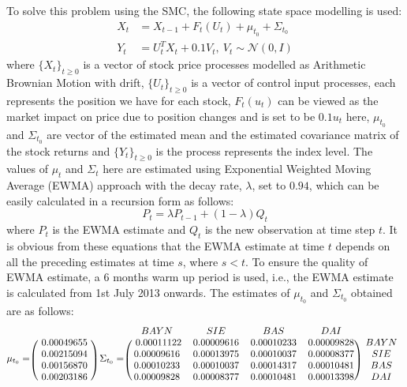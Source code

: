To solve this problem using the SMC,  the following state space modelling is used:
\begin{align}
  X_t &= X_{t-1} + F_t(U_t) + \mu_{t_0} + \Sigma_{t_0} \\
  Y_t &= U^T_tX_t + 0.1V_t,~V_t \sim \mathcal{N}(0, I)
\end{align}
where $\{X_t\}_{t \geq 0}$ is a vector of stock price processes modelled as Arithmetic Brownian Motion with drift, $\{U_t\}_{t \geq 0}$ is a vector of control input processes, each represents the position we have for each stock, $F_t(u_t)$ can be viewed as the market impact on price due to position changes and is set to be $0.1u_t$ here, $\mu_{t_0}$ and $\Sigma_{t_0}$ are vector of the estimated mean and the estimated covariance matrix of the stock returns and $\{Y_t\}_{t \geq 0}$ is the process represents the index level. The values of $\mu_t$ and $\Sigma_t$ here are estimated using Exponential Weighted Moving Average (EWMA) approach with the decay rate, $\lambda$, set to $0.94$, which can be easily calculated in a recursion form as follows:
\begin{equation}
  P_t = \lambda P_{t-1} + (1-\lambda) Q_{t}
\end{equation}
where $P_t$ is the EWMA estimate and $Q_t$ is the new observation at time step $t$. It is obvious from these equations that the EWMA estimate at time $t$ depends on all the preceding estimates at time $s$, where $s < t$. To ensure the quality of EWMA estimate, a 6 months warm up period is used, i.e., the EWMA estimate is calculated from 1st July 2013 onwards. The estimates of $\mu_{t_0}$ and $\Sigma_{t_0}$ obtained are as follows:
\begin{equation}
\mu_{t_0} =
\begin{blockarray}{c}
\\
\begin{block}{(c)}
~ 0.00049655 ~ \\
0.00215094 \\
0.00156870 \\
0.00203186 \\
\end{block}
\end{blockarray}
~\Sigma_{t_0} =
\begin{blockarray}{ccccc}
  BAYN & SIE & BAS & DAI & \\
\begin{block}{(cccc)c}
 ~ 0.00011122 & 0.00009616 & 0.00010233 & 0.00009828 ~ & BAYN \\
0.00009616 & 0.00013975 & 0.00010037 & 0.00008377 ~ & SIE \\
0.00010233 & 0.00010037 & 0.00014317 & 0.00010481 & BAS \\
0.00009828 & 0.00008377 & 0.00010481 & 0.00013398 & DAI \\
\end{block}
\end{blockarray}
\end{equation}
 

